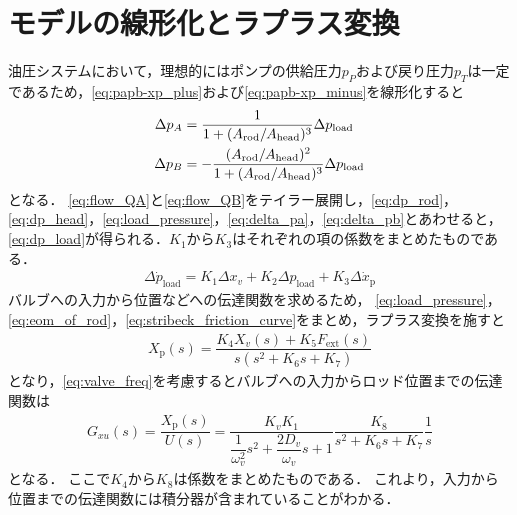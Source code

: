\section{モデルの線形化とラプラス変換}
油圧システムにおいて，理想的にはポンプの供給圧力$p_P$および戻り圧力$p_T$は一定であるため，\eqnname\eqref{eq:papb-xp_plus}および\eqnname\eqref{eq:papb-xp_minus}を線形化すると
\begin{align}
    \label{eq:delta_pa}
    \Delta p_A &= \dfrac{1}{1+(A_\mathrm{rod}/A_\mathrm{head})^3} \Delta p_\mathrm{load}\\
    \label{eq:delta_pb}
    \Delta p_B &= -\dfrac{(A_\mathrm{rod}/A_\mathrm{head})^2}{1+(A_\mathrm{rod}/A_\mathrm{head})^3} \Delta p_\mathrm{load}
\end{align}
となる．
\eqnname\eqref{eq:flow_QA}と\eqnname\eqref{eq:flow_QB}をテイラー展開し，\eqnname\eqref{eq:dp_rod}，\eqnname\eqref{eq:dp_head}，\eqnname\eqref{eq:load_pressure}，\eqnname\eqref{eq:delta_pa}，\eqnname\eqref{eq:delta_pb}とあわせると，\eqnname\eqref{eq:dp_load}が得られる．$K_1$から$K_3$はそれぞれの項の係数をまとめたものである．
\begin{align}
    \label{eq:dp_load}
    \Delta \dot{p}_\mathrm{load} = K_1 \Delta x_v +K_2 \Delta p_\mathrm{load} +K_3 \Delta \dot{x}_\mathrm{p}
\end{align}
バルブへの入力から位置などへの伝達関数を求めるため，
\eqnname\eqref{eq:load_pressure}，\eqnname\eqref{eq:eom_of_rod}，\eqnname\eqref{eq:stribeck_friction_curve}をまとめ，ラプラス変換を施すと
\begin{align}
    \label{eq:lhapras}
    X_\mathrm{p}(s) = \dfrac{K_4 X_v(s)+K_5 F_\mathrm{ext}(s)}{s(s^2 + K_6s + K_7)}
\end{align}
となり，\eqnname\eqref{eq:valve_freq}を考慮するとバルブへの入力からロッド位置までの伝達関数は
\begin{align}
    \label{eq:tf_Gxu}
    G_{xu}(s) = \dfrac{X_\mathrm{p}(s)}{U(s)} = \dfrac{K_vK_1}{\dfrac{1}{\omega_v^2}s^2 + \dfrac{2D_v}{\omega_v}s + 1} \dfrac{K_8}{s^2 + K_6s + K_7} \dfrac{1}{s}
\end{align}
となる．
ここで$K_4$から$K_8$は係数をまとめたものである．
これより，入力から位置までの伝達関数には積分器が含まれていることがわかる．

